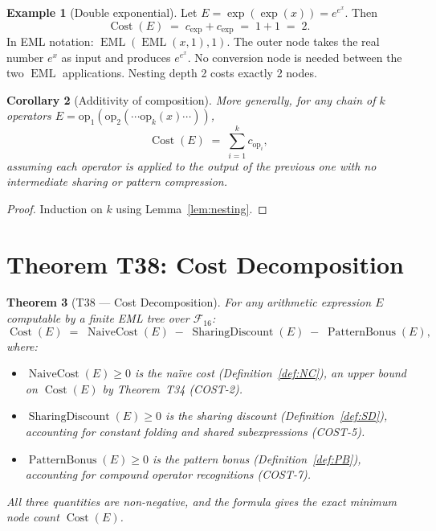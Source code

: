 \documentclass[12pt,a4paper]{article}
\newtheorem{theorem}{Theorem}[section]
\newtheorem{corollary}[theorem]{Corollary}
\theoremstyle{definition}
\newtheorem{example}[theorem]{Example}
\newcommand{\EML}{\operatorname{EML}}
\newcommand{\Cost}{\operatorname{Cost}}
\newcommand{\NC}{\operatorname{NaiveCost}}
\newcommand{\SD}{\operatorname{SharingDiscount}}
\newcommand{\PB}{\operatorname{PatternBonus}}
\begin{document}
\begin{example}[Double exponential]
\label{ex:doubleexp}
Let $E = \exp(\exp(x)) = e^{e^x}$.  Then
\[
  \Cost(E) \;=\; c_{\exp} + c_{\exp} \;=\; 1 + 1 \;=\; 2.
\]
In EML notation: $\EML(\EML(x,1),1)$.
The outer node takes the real number $e^x$ as input and produces $e^{e^x}$.
No conversion node is needed between the two $\EML$ applications.
Nesting depth 2 costs exactly 2 nodes.
\end{example}

\begin{corollary}[Additivity of composition]
\label{cor:additivity}
More generally, for any chain of $k$ operators
$E = \mathrm{op}_1(\mathrm{op}_2(\cdots\mathrm{op}_k(x)\cdots))$,
\[
  \Cost(E) \;=\; \sum_{i=1}^{k} c_{\mathrm{op}_i},
\]
assuming each operator is applied to the output of the previous one with
no intermediate sharing or pattern compression.
\end{corollary}

\begin{proof}
Induction on $k$ using Lemma~\ref{lem:nesting}.
\end{proof}

\section{Theorem T38: Cost Decomposition}
\label{sec:T38}

\begin{theorem}[T38 --- Cost Decomposition]
\label{thm:T38}
For any arithmetic expression $E$ computable by a finite EML tree over
$\mathcal{F}_{16}$:
\[
  \boxed{\Cost(E) \;=\; \NC(E) \;-\; \SD(E) \;-\; \PB(E),}
\]
where:
\begin{itemize}
  \item $\NC(E) \geq 0$ is the na\"{i}ve cost (Definition~\ref{def:NC}),
        an upper bound on $\Cost(E)$ by Theorem~T34 (COST-2).
  \item $\SD(E) \geq 0$ is the sharing discount (Definition~\ref{def:SD}),
        accounting for constant folding and shared subexpressions (COST-5).
  \item $\PB(E) \geq 0$ is the pattern bonus (Definition~\ref{def:PB}),
        accounting for compound operator recognitions (COST-7).
\end{itemize}
All three quantities are non-negative, and the formula gives the exact
minimum node count $\Cost(E)$.
\end{theorem}
\end{document}
